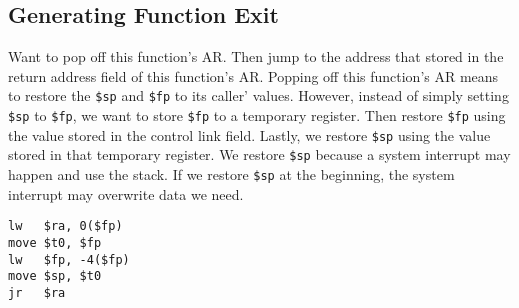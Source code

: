 \documentclass[11pt]{article}
\begin{document}
\subsection{Generating Function Exit}
\label{sec:orgf663793}
Want to pop off this function's AR. Then jump to the address that stored in the return address
field of this function's AR. Popping off this function's AR means to restore the \texttt{\$sp} and \texttt{\$fp}
to its caller' values. However, instead of simply setting \texttt{\$sp} to \texttt{\$fp}, we want to store \texttt{\$fp}
to a temporary register. Then restore \texttt{\$fp} using the value stored in the control link
field. Lastly, we restore \texttt{\$sp} using the value stored in that temporary register. We restore
\texttt{\$sp} because a system interrupt may happen and use the stack. If we restore \texttt{\$sp} at the
beginning, the system interrupt may overwrite data we need.
\begin{verbatim}
lw   $ra, 0($fp)
move $t0, $fp
lw   $fp, -4($fp) 
move $sp, $t0 
jr   $ra
\end{verbatim}
\end{document}
